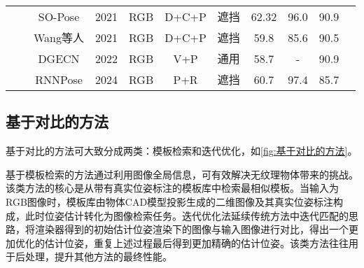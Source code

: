 \begin{table}[!t]
{\begin{tabular}{|ccc|c|c|c|c|c|c|c|c|}
    \multicolumn{1}{|c|}{} & \multicolumn{1}{l|}{} & SO-Pose\cite{di2021so} & 2021 & RGB & D+C+P & 遮挡 & \multicolumn{1}{c|}{62.32} & 96.0 & 90.9 \\
    \cline{3-10}

    \multicolumn{1}{|c|}{} & \multicolumn{1}{l|}{}& Wang等人\cite{wang2021occlusion} & 2021 & RGB & D+C+P & 遮挡 & \multicolumn{1}{c|}{59.8} & 85.6 & 90.5 \\
    \cline{3-10}

    \multicolumn{1}{|c|}{} &\multicolumn{1}{l|}{}& DGECN\cite{cao2022dgecn} & 2022 & RGB & V+P & 通用 & \multicolumn{1}{c|}{58.7} & - & 90.9 \\
    \cline{3-10}
    
    \multicolumn{1}{|c|}{} & \multicolumn{1}{l|}{} & RNNPose\cite{Xu2024RNNPose} & 2024 & RGB & P+R & 遮挡 & \multicolumn{1}{c|}{60.7} & 97.4 & 85.7 \\

    \hline
    \end{tabular}%
    }
    \label{tab:回归方法}
    \vspace{-1em}
\end{table}

\subsection{基于对比的方法}\label{基于对比的方法}

\par 基于对比的方法可大致分成两类：模板检索和迭代优化，如\autoref{fig:基于对比的方法}。

\par 基于模板检索的方法通过利用图像全局信息，可有效解决无纹理物体带来的挑战。该类方法的核心是从带有真实位姿标注的模板库中检索最相似模板。当输入为RGB图像时，模板库由物体CAD模型投影生成的二维图像及其真实位姿标注构成，此时位姿估计转化为图像检索任务。迭代优化法延续传统方法中迭代匹配的思路，将渲染器得到的初始估计位姿渲染下的图像与输入图像进行对比，得出一个更加优化的估计位姿，重复上述过程最后得到更加精确的估计位姿。该类方法往往用于后处理，提升其他方法的最终性能。

